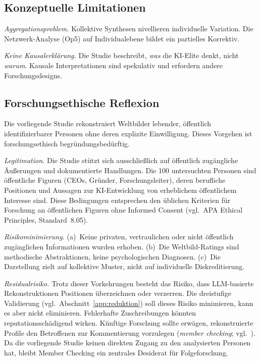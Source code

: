 \documentclass[12pt,a4paper]{article}
\begin{document}
\subsection{Konzeptuelle Limitationen}

\emph{Aggregationsproblem.} Kollektive Synthesen nivellieren individuelle Variation. Die Netzwerk-Analyse (Op5) auf Individualebene bildet ein partielles Korrektiv.

\emph{Keine Kausalerkl\"arung.} Die Studie beschreibt, \emph{was} die KI-Elite denkt, nicht \emph{warum}. Kausale Interpretationen sind spekulativ und erfordern andere Forschungsdesigns.

\subsection{Forschungsethische Reflexion}

Die vorliegende Studie rekonstruiert Weltbilder lebender, \"offentlich identifizierbarer Personen ohne deren explizite Einwilligung. Dieses Vorgehen ist forschungsethisch begr\"undungsbed\"urftig.

\emph{Legitimation.} Die Studie st\"utzt sich ausschlie\ss{}lich auf \"offentlich zug\"angliche \"Au\ss{}erungen und dokumentierte Handlungen. Die 100 untersuchten Personen sind \"offentliche Figuren (CEOs, Gr\"under, Forschungsleiter), deren berufliche Positionen und Aussagen zur KI-Entwicklung von erheblichem \"offentlichem Interesse sind. Diese Bedingungen entsprechen den \"ublichen Kriterien f\"ur Forschung an \"offentlichen Figuren ohne Informed Consent (vgl.\ APA Ethical Principles, Standard~8.05).

\emph{Risikominimierung.} (a)~Keine privaten, vertraulichen oder nicht \"offentlich zug\"anglichen Informationen wurden erhoben. (b)~Die Weltbild-Ratings sind methodische Abstraktionen, keine psychologischen Diagnosen. (c)~Die Darstellung zielt auf kollektive Muster, nicht auf individuelle Diskreditierung.

\emph{Residualrisiko.} Trotz dieser Vorkehrungen besteht das Risiko, dass LLM-basierte Rekonstruktionen Positionen \"uberzeichnen oder verzerren. Die dreistufige Validierung (vgl.\ Abschnitt~\ref{app:reduktion}) soll dieses Risiko minimieren, kann es aber nicht eliminieren. Fehlerhafte Zuschreibungen k\"onnten reputationssch\"adigend wirken. K\"unftige Forschung sollte erw\"agen, rekonstruierte Profile den Betroffenen zur Kommentierung vorzulegen (\textit{member checking}; vgl.\ \citealt{SoysalTurkmen2024}). Da die vorliegende Studie keinen direkten Zugang zu den analysierten Personen hat, bleibt Member Checking ein zentrales Desiderat f\"ur Folgeforschung.
\end{document}
